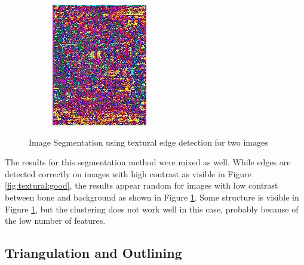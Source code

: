\documentclass[pdftex,12pt,a4paper]{report}
\begin{document}
\begin{figure}[h]
\begin{subfigure}[b]{0.24\textwidth}
		\subcaption{}
		\label{fig:textural:bad}
	\end{subfigure}
	\begin{subfigure}[b]{0.24\textwidth}
		\centering
		\includegraphics[width=.9\linewidth]{img/segmentation/bad/textural-edges/segmented.jpg}
		\subcaption*{}
		\label{}
	\end{subfigure}
	\caption{Image Segmentation using textural edge detection for two images}
	\label{fig:textural}
\end{figure}

The results for this segmentation method were mixed as well. While edges are detected correctly on images with high contrast as visible in Figure \ref{fig:textural:good}, the results appear random for images with low contrast between bone and background as shown in Figure \ref{fig:textural:bad}. Some structure is visible in Figure \ref{fig:textural:bad}, but the clustering does not work well in this case, probably because of the low number of features.

\subsection{Triangulation and Outlining}
\end{document}
